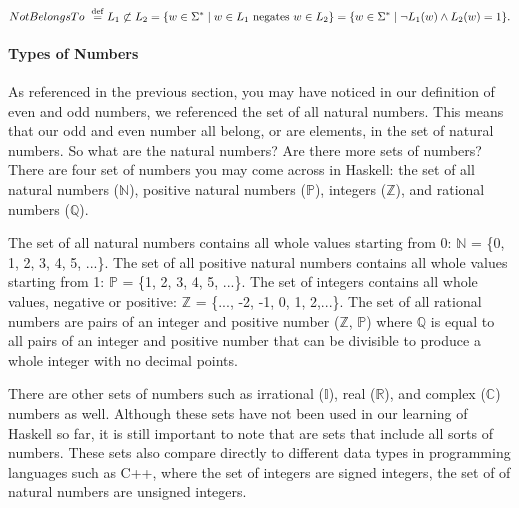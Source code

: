 \documentclass{article}
\begin{document}
 $$Not Belongs To \ \stackrel{\rm def}{=} L_1\not\subset L_2 = \{w\in\Sigma^\ast \mid w\in L_1 \textrm{ negates } w\in L_2\}= \{w\in\Sigma^\ast \mid \neg L_1(w) \wedge L_2(w) = 1\}.$$

\paragraph{Types of Numbers}

As referenced in the previous section, you may have noticed in our definition of even and odd numbers, we referenced the set of all natural numbers. This means that our odd and even number all belong, or are elements, in the set of natural numbers. So what are the natural numbers? Are there more sets of numbers? There are four set of numbers you may come across in Haskell: the set of all natural numbers ($\mathbb N$), positive natural numbers ($\mathbb P$), integers ($\mathbb Z$), and rational numbers ($\mathbb Q$).

\medskip\noindent
The set of all natural numbers contains all whole values starting from 0: $\mathbb N$ = \{0, 1, 2, 3, 4, 5, ...\}. The set of all positive natural numbers contains all whole values starting from 1: $\mathbb P$ = \{1, 2, 3, 4, 5, ...\}. The set of integers contains all whole values, negative or positive: $\mathbb Z$ = \{..., -2, -1, 0, 1, 2,...\}. The set of all rational numbers are pairs of an integer and positive number ($\mathbb Z$, $\mathbb P$) where $\mathbb Q$ is equal to all pairs of an integer and positive number that can be divisible to produce a whole integer with no decimal points. 

\medskip\noindent
There are other sets of numbers such as irrational ($\mathbb I$), real ($\mathbb R$), and complex ($\mathbb C$) numbers as well. Although these sets have not been used in our learning of Haskell so far, it is still important to note that are sets that include all sorts of numbers. These sets also compare directly to different data types in programming languages such as C++, where the set of integers are signed integers, the set of of natural numbers are unsigned integers. 
\end{document}
